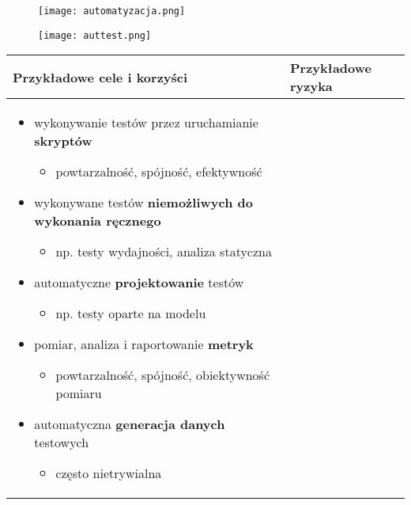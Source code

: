 \documentclass[../main.tex]{subfiles}
\begin{document}
    \begin{figure}[H]
        \texttt{[image: automatyzacja.png]}
    \end{figure}

    \begin{figure}[H]
        \texttt{[image: auttest.png]}
    \end{figure}

    \begin{table}[H]
        \begin{center}
            \begin{tabular}{| p{8cm} | p{8cm} |}
                \hline
                \textbf{Przykładowe cele i korzyści} & \textbf{Przykładowe ryzyka}\\
                \hline
                \begin{itemize}
                    \item wykonywanie testów przez uruchamianie \textbf{skryptów}
                    \begin{itemize}
                        \item powtarzalność, spójność, efektywność
                    \end{itemize}
                    \item wykonywane testów \textbf{niemożliwych do wykonania ręcznego}
                    \begin{itemize}
                        \item np. testy wydajności, analiza statyczna
                    \end{itemize}
                    \item automatyczne \textbf{projektowanie} testów
                    \begin{itemize}
                        \item np. testy oparte na modelu
                    \end{itemize}
                    \item pomiar, analiza i raportowanie \textbf{metryk}
                    \begin{itemize}
                        \item powtarzalność, spójność, obiektywność pomiaru
                    \end{itemize}
                    \item automatyczna \textbf{generacja danych} testowych
                    \begin{itemize}
                        \item często nietrywialna

\end{itemize}
\end{itemize}
\end{tabular}
\end{center}
\end{table}
\end{document}
